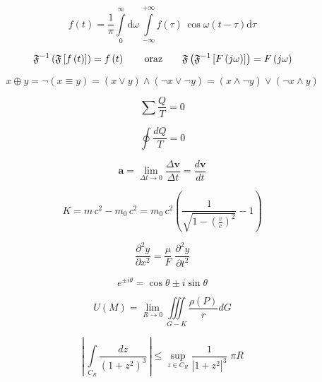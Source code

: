 \begin{equation}
    f(t) = \frac{1}{\pi} \int\limits_0^\infty \mathrm{d} \omega \,\int\limits_{-\infty}^{+\infty} f(\tau)\, \cos \omega (t-\tau)  \mathrm{d}\tau
\end{equation}

\[
\mathfrak{F}^{-1}\left(\mathfrak{F} \left[ f\left(t \right ) \right ] \right ) = f \left(t \right )
\qquad \textup{oraz} \qquad
\mathfrak{F}\left(\mathfrak{F}^{-1} \left[ F\left(j\omega \right ) \right ] \right ) = F \left(j\omega \right )
\]

\begin{equation*}
    x \oplus y = \neg (x \equiv y) = (x \vee y) \wedge (\neg x \vee \neg y) = (x \wedge \neg y) \vee (\neg x \wedge y)
\end{equation*}

\begin{equation*}
    \sum \frac{Q}{T} = 0
\end{equation*}

\begin{equation}
    \oint \frac{dQ}{T} = 0
\end{equation}

\begin{equation}
    \pmb{a} = \lim\limits_{\Delta t \to 0} \frac{\Delta \pmb{v}}{\Delta t} = \frac{d\pmb{v}}{dt}
\end{equation}

\begin{equation}
K = m\,c^2 - m_0\,c^2 
 = m_0\,c^2 \left(
  \frac{1}{ \sqrt{1 - \left( \frac{v}{c} \right)^2 } } -1 
 \right)
\end{equation}

\begin{equation}
    \frac{\partial^2 y}{\partial x^2} = \frac{\mu}{F} \; \frac{\partial^2 y}{\partial t^2}
\end{equation}

\begin{equation}
    e^{\pm i\theta} = \cos \theta \pm i \sin\theta
\end{equation}

\begin{equation}
    U(M) = \lim\limits_{R\to 0} \iiint\limits_{G-K}\frac{\rho(P)}{r}dG
\end{equation}

\begin{equation*}
    \left| \, \int\limits_{C_R} \frac{dz}{\left( 1+z^2 \right )^3} \, \right| \leqslant \sup\limits_{z \in C_R} \frac{1}{\left| 1+z^2 \right|^3} \; \pi R
\end{equation*}

